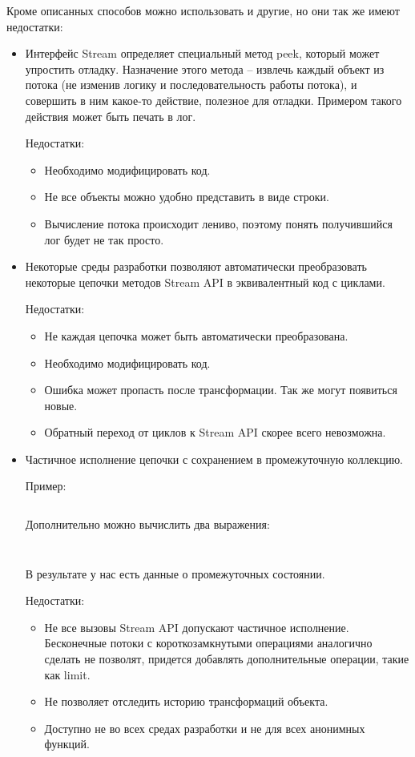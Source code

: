Кроме описанных способов можно использовать и другие, но они так же имеют недостатки:
\begin{itemize}
	\item Интерфейс Stream определяет специальный метод peek, который может упростить отладку. Назначение этого метода -- извлечь каждый объект из потока (не изменив логику и последовательность работы потока), и совершить в ним какое-то действие, полезное для отладки. Примером такого действия может быть печать в лог. 
	
	Недостатки: 
	\begin{itemize}
		\item Необходимо модифицировать код.
		\item Не все объекты можно удобно представить в виде строки.
		\item Вычисление потока происходит лениво, поэтому понять получившийся лог будет не так просто.
	\end{itemize}

	\item Некоторые среды разработки позволяют автоматически преобразовать некоторые цепочки методов Stream API в эквивалентный код с циклами. 
	
	Недостатки:
	\begin{itemize}
		\item Не каждая цепочка может быть автоматически преобразована.
		\item Необходимо модифицировать код.
		\item Ошибка может пропасть после трансформации. Так же могут появиться новые.
		\item Обратный переход от циклов к Stream API скорее всего невозможна.
	\end{itemize}
	
	\item Частичное исполнение цепочки с сохранением в промежуточную коллекцию.
	
	Пример: 
	\inputminted{java}{chapter1/code/PartialEvaluationFull.java}
	
	Дополнительно можно вычислить два выражения:
	\inputminted{java}{chapter1/code/PartialEvaluation1.java}
	
	\inputminted{java}{chapter1/code/PartialEvaluation2.java}
	
	В результате у нас есть данные о промежуточных состоянии.
	
	Недостатки:
	\begin{itemize}
		\item Не все вызовы Stream API допускают частичное исполнение. Бесконечные потоки с короткозамкнутыми операциями аналогично сделать не позволят, придется добавлять дополнительные операции, такие как limit.
		\item Не позволяет отследить историю трансформаций объекта.
		\item Доступно не во всех средах разработки и не для всех анонимных функций.
	\end{itemize}
\end{itemize}

